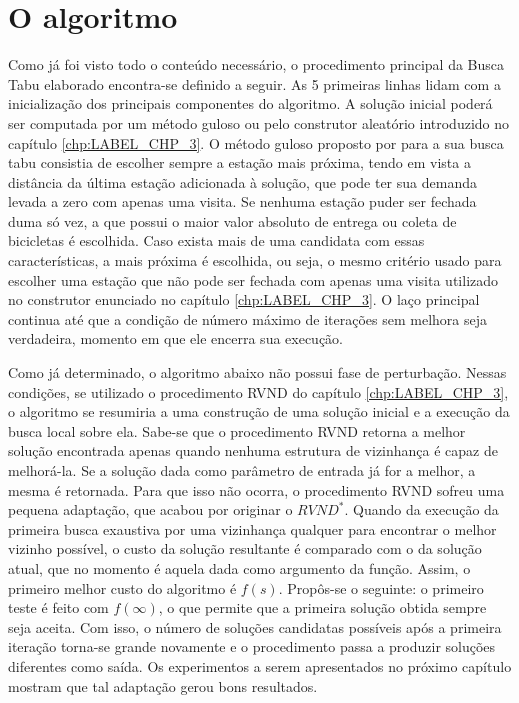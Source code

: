 \section{O algoritmo}\label{sec:LABEL_CHP_6_SEC_E}

\par Como já foi visto todo o conteúdo necessário, o procedimento principal da Busca Tabu elaborado encontra-se definido a seguir. As 5 primeiras linhas lidam com a inicialização dos principais componentes do algoritmo. A solução inicial poderá ser computada por um método guloso ou pelo construtor aleatório introduzido no capítulo \ref{chp:LABEL_CHP_3}. O método guloso proposto por \citep{art:REF_ART_2} para a sua busca tabu consistia de escolher sempre a estação mais próxima, tendo em vista a distância da última estação adicionada à solução, que pode ter sua demanda levada a zero com apenas uma visita. Se nenhuma estação puder ser fechada duma só vez, a que possui o maior valor absoluto de entrega ou coleta de bicicletas é escolhida. Caso exista mais de uma candidata com essas características, a mais próxima é escolhida, ou seja, o mesmo critério usado para escolher uma estação que não pode ser fechada com apenas uma visita utilizado no construtor enunciado no capítulo \ref{chp:LABEL_CHP_3}. O laço principal continua até que a condição de número máximo de iterações sem melhora seja verdadeira, momento em que ele encerra sua execução.

\par Como já determinado, o algoritmo abaixo não possui fase de perturbação. Nessas condições, se utilizado o procedimento RVND do capítulo \ref{chp:LABEL_CHP_3}, o algoritmo se resumiria a uma construção de uma solução inicial e a execução da busca local sobre ela. Sabe-se que o procedimento RVND retorna a melhor solução encontrada apenas quando nenhuma estrutura de vizinhança é capaz de melhorá-la. Se a solução dada como parâmetro de entrada já for a melhor, a mesma é retornada. Para que isso não ocorra, o procedimento RVND sofreu uma pequena adaptação, que acabou por originar o $RVND^*$. Quando da execução da primeira busca exaustiva por uma vizinhança qualquer para encontrar o melhor vizinho possível, o custo da solução resultante é comparado com o da solução atual, que no momento é aquela dada como argumento da função. Assim, o primeiro melhor custo do algoritmo é $f(s)$. Propôs-se o seguinte: o primeiro teste é feito com $f(\infty)$, o que permite que a primeira solução obtida sempre seja aceita. Com isso, o número de soluções candidatas possíveis após a primeira iteração torna-se grande novamente e o procedimento passa a produzir soluções diferentes como saída. Os experimentos a serem apresentados no próximo capítulo mostram que tal adaptação gerou bons resultados.


